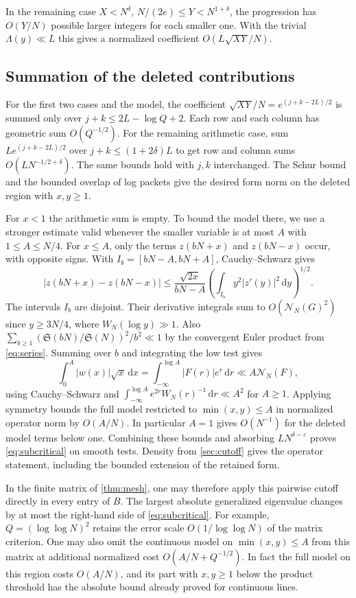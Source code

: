 \documentclass[11pt,a4paper]{article}
\numberwithin{equation}{section}
\newcommand{\SSS}{\mathfrak S}
\newcommand{\ud}{\mathrm d}
\newcommand{\NN}{\mathcal N_N}
\begin{document}
In the remaining case $X<N^\delta$, $N/(2e)\le Y<N^{1+\delta}$,
the progression has $O(Y/N)$ possible larger integers for
each smaller one. With the trivial $\Lambda(y)\ll L$ this gives
a normalized coefficient $O(L\sqrt{XY}/N)$.

\subsection{Summation of the deleted contributions}

For the first two cases and the model, the coefficient
$\sqrt{XY}/N=e^{(j+k-2L)/2}$ is summed only over
$j+k\le 2L-\log Q+2$. Each row and each column has geometric
sum $O(Q^{-1/2})$. For the remaining arithmetic case, sum
$L e^{(j+k-2L)/2}$ over $j+k\le(1+2\delta)L$ to get row and
column sums $O(LN^{-1/2+\delta})$. The same bounds hold with
$j,k$ interchanged. The Schur bound and the bounded overlap
of log packets give the desired form norm on the deleted
region with $x,y\ge1$.

For $x<1$ the arithmetic sum is empty. To bound the model there,
we use a stronger estimate valid whenever the smaller variable
is at most $A$ with $1\le A\le N/4$. For $x\le A$, only the
terms $z(bN+x)$ and $z(bN-x)$ occur, with opposite signs. With
$I_b=[bN-A,bN+A]$, Cauchy--Schwarz gives
\[
 |z(bN+x)-z(bN-x)|
   \le\frac{\sqrt{2x}}{bN-A}
       \left(\int_{I_b}y^2|z'(y)|^2\,\ud y\right)^{1/2}.
\]
The intervals $I_b$ are disjoint. Their derivative integrals sum
to $O(\NN(G)^2)$ since $y\ge3N/4$, where $W_N(\log y)\gg1$.
Also $\sum_{b\ge1}(\SSS(bN)/\SSS(N))^2/b^2\ll1$
by the convergent Euler product from \cref{eq:series}.
Summing over $b$ and integrating the low test gives
\[
 \int_0^A |w(x)|\sqrt{x}\,\ud x
  =\int_{-\infty}^{\log A}|F(r)|e^r\,\ud r
  \ll A\NN(F),
\]
using Cauchy--Schwarz and
$\int_{-\infty}^{\log A}e^{2r}W_N(r)^{-1}\,\ud r\ll A^2$ for $A\ge1$.
Applying symmetry bounds the full model restricted to
$\min(x,y)\le A$ in normalized operator norm by $O(A/N)$.
In particular $A=1$ gives $O(N^{-1})$ for the deleted model
terms below one.
Combining these bounds and absorbing $L N^{\delta-\varepsilon}$
proves \cref{eq:subcritical} on smooth tests. Density from
\cref{sec:cutoff} gives the operator statement, including the
bounded extension of the retained form.

In the finite matrix of \cref{thm:mesh}, one may therefore
apply this pairwise cutoff directly in every entry of $B$.
The largest absolute generalized eigenvalue changes by at most
the right-hand side of \cref{eq:subcritical}. For example,
$Q=(\log\log N)^2$ retains the error scale
$O(1/\log\log N)$ of the matrix criterion.
One may also omit the continuous model on $\min(x,y)\le A$
from this matrix at additional normalized cost
$O(A/N+Q^{-1/2})$. In fact the full model on this region costs
$O(A/N)$, and its part with $x,y\ge1$ below the product threshold
has the absolute bound already proved for continuous lines.
\end{document}
